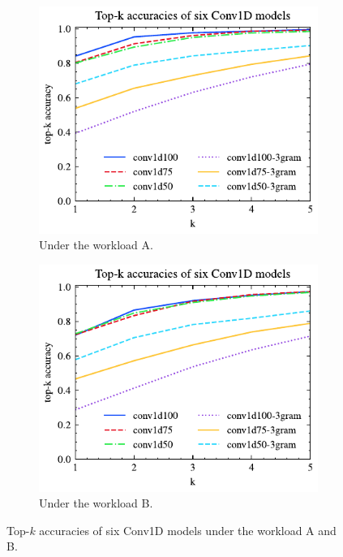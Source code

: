 \begin{figure}[!th]
	\centering
	\begin{subfigure}{0.45\textwidth}
		\centering
		\includegraphics[]{my/graphics/top_k_conv1d_A.pdf}
		\caption{Under the workload A.}
		\label{fig:top_k_conv1d_A}
	\end{subfigure}
	\hfill
	\begin{subfigure}{0.45\textwidth}
		\centering
		\includegraphics[]{my/graphics/top_k_conv1d_B.pdf}
		\caption{Under the workload B.}
		\label{fig:top_k_conv1d_B}
	\end{subfigure}
	\caption{Top-$k$ accuracies of six Conv1D models under the workload A and B.}
	\label{fig:top_k_conv1d_all}
\end{figure}
